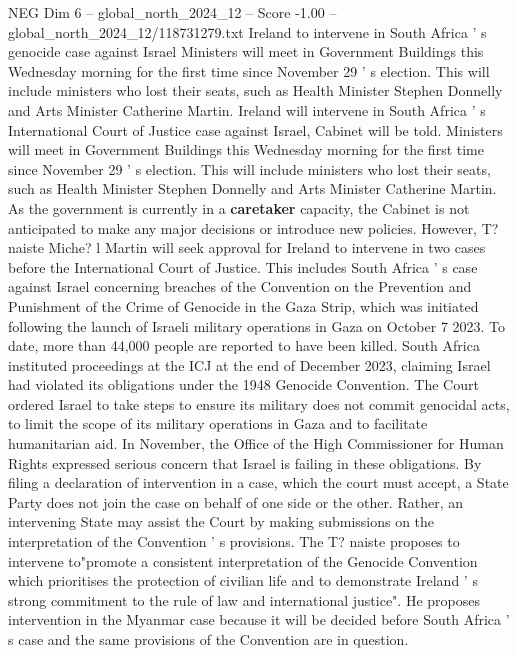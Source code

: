 \begin{textsample}{NEG Dim 6 – global\_north\_2024\_12 – Score -1.00 – global\_north\_2024\_12/118731279.txt}  \label{ex:f6_neg_193}
Ireland to intervene in South Africa ' s genocide case against Israel Ministers will meet in Government Buildings this Wednesday morning for the first time since November 29 ' s election.
This will include ministers who lost their seats, such as Health Minister Stephen Donnelly and Arts Minister Catherine Martin.
Ireland will intervene in South Africa ' s International Court of Justice case against Israel, Cabinet will be told.
Ministers will meet in Government Buildings this Wednesday morning for the first time since November 29 ' s election.
This will include ministers who lost their seats, such as Health Minister Stephen Donnelly and Arts Minister Catherine Martin.
As the government is currently in a \textbf{caretaker} capacity, the Cabinet is not anticipated to make any major decisions or introduce new policies.
However, T? naiste Miche? l Martin will seek approval for Ireland to intervene in two cases before the International Court of Justice.
This includes South Africa ' s case against Israel concerning breaches of the Convention on the Prevention and Punishment of the Crime of Genocide in the Gaza Strip, which was initiated following the launch of Israeli military operations in Gaza on October 7 2023.
To date, more than 44,000 people are reported to have been killed.
South Africa instituted proceedings at the ICJ at the end of December 2023, claiming Israel had violated its obligations under the 1948 Genocide Convention.
The Court ordered Israel to take steps to ensure its military does not commit genocidal acts, to limit the scope of its military operations in Gaza and to facilitate humanitarian aid.
In November, the Office of the High Commissioner for Human Rights expressed serious concern that Israel is failing in these obligations.
By filing a declaration of intervention in a case, which the court must accept, a State Party does not join the case on behalf of one side or the other.
Rather, an intervening State may assist the Court by making submissions on the interpretation of the Convention ' s provisions.
The T? naiste proposes to intervene to"promote a consistent interpretation of the Genocide Convention which prioritises the protection of civilian life and to demonstrate Ireland ' s strong commitment to the rule of law and international justice".
He proposes intervention in the Myanmar case because it will be decided before South Africa ' s case and the same provisions of the Convention are in question.

\end{textsample}
